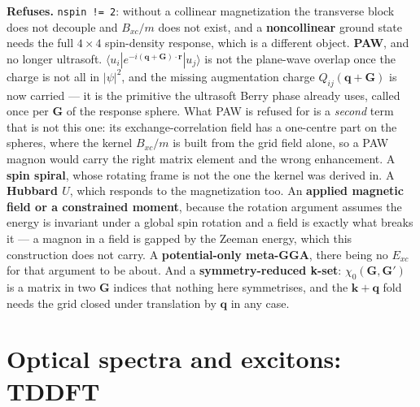 \documentclass[11pt,a4paper]{article}
\newcommand{\code}[1]{\texttt{\small #1}}
\begin{document}
\begin{refuses}
\textbf{Refuses.} \code{nspin != 2}: without a collinear magnetization the
transverse block does not decouple and $B_{xc}/m$ does not exist, and a
\textbf{noncollinear} ground state needs the full $4\times4$ spin-density
response, which is a different object. \textbf{PAW}, and no longer
ultrasoft. $\langle u_i|e^{-i(\mathbf q+\mathbf G)\cdot\mathbf r}|u_j\rangle$
is not the plane-wave overlap once the charge is not all in $|\psi|^2$, and the
missing augmentation charge $Q_{ij}(\mathbf q+\mathbf G)$ is now carried --- it
is the primitive the ultrasoft Berry phase already uses, called once per
$\mathbf G$ of the response sphere. What PAW is refused for is a \emph{second}
term that is not this one: its exchange-correlation field has a one-centre part
on the spheres, where the kernel $B_{xc}/m$ is built from the grid field alone,
so a PAW magnon would carry the right matrix element and the wrong
enhancement. A \textbf{spin
spiral}, whose rotating frame is not the one the kernel was derived in. A
\textbf{Hubbard $U$}, which responds to the magnetization too. An
\textbf{applied magnetic field or a constrained moment}, because the rotation
argument assumes the energy is invariant under a global spin rotation and a
field is exactly what breaks it --- a magnon in a field is gapped by the Zeeman
energy, which this construction does not carry. A \textbf{potential-only
meta-GGA}, there being no $E_{xc}$ for that argument to be about. And a
\textbf{symmetry-reduced k-set}: $\chi_0(\mathbf G,\mathbf G')$ is a matrix in
two $\mathbf G$ indices that nothing here symmetrises, and the
$\mathbf k+\mathbf q$ fold needs the grid closed under translation by
$\mathbf q$ in any case.
\end{refuses}

\section{Optical spectra and excitons: TDDFT}
\end{document}
